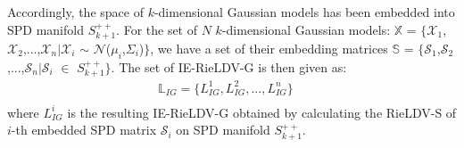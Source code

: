 \documentclass[review]{elsarticle}
\begin{document}
Accordingly, the space of $k$-dimensional Gaussian models has been embedded into SPD manifold $S_{k+1}^{++}$. For the set of $N$ $k$-dimensional Gaussian models: $\mathbb{X}$ =  $\{$$\mathcal{X}_1$,$\mathcal{X}_2$,...,$\mathcal{X}_n$$|$$\mathcal{X}_i$ $\sim$ $\mathcal{N}$($\mu_i$,$\Sigma_i$)$\}$, we have a set of their embedding matrices $\mathbb{S}$ =  $\{$$\mathcal{S}_1$,$\mathcal{S}_2$,...,$\mathcal{S}_n$$|$$\mathcal{S}_i$ $\in$ $S_{k+1}^{++}$$\}$. The set of IE-RieLDV-G is then given as: 
\begin{equation}
\label{IE-RieLDV-G}
\begin{split}
\mathbb{L}_{IG} = \{L_{IG}^1,L_{IG}^2,...,L_{IG}^n \}  \quad \\
\end{split}
\end{equation}
where $L_{IG}^i$ is the resulting IE-RieLDV-G obtained by calculating the RieLDV-S of $i$-th embedded SPD matrix $\mathcal{S}_i$ on SPD manifold $S_{k+1}^{++}$.
\begin{table}
\renewcommand\arraystretch{1.25}
\centering
\caption{\label{tab:overlapping}Metrics and associated gradients on the SPD manifold.}
\vspace {1.5mm}
\label{Gradient_OnSPD}
\scriptsize
{}
\end{table}
\end{document}
